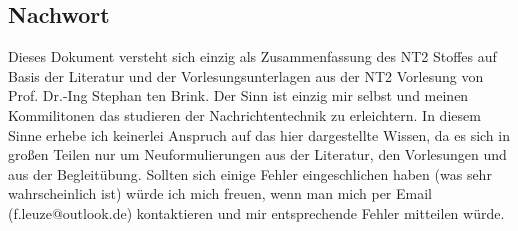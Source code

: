 \subsection{Nachwort}
Dieses Dokument versteht sich einzig als Zusammenfassung des NT2 Stoffes auf Basis der Literatur und der Vorlesungsunterlagen aus der NT2 Vorlesung von Prof. Dr.-Ing Stephan ten Brink. Der Sinn ist einzig mir selbst und meinen Kommilitonen das studieren der Nachrichtentechnik zu erleichtern. In diesem Sinne erhebe ich keinerlei Anspruch auf das hier dargestellte Wissen, da es sich in großen Teilen nur um Neuformulierungen aus der Literatur, den Vorlesungen und aus der Begleitübung. Sollten sich einige Fehler eingeschlichen haben (was sehr wahrscheinlich ist) würde ich mich freuen, wenn man mich per Email (f.leuze@outlook.de) kontaktieren und mir entsprechende Fehler mitteilen würde.